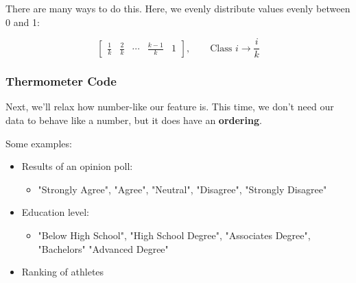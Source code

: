                 \miniex There are many ways to do this. Here, we evenly distribute values evenly between 0 and 1:
    
                    \begin{equation}
                        \begin{bmatrix}
                            \frac{1}{k} & \frac{2}{k} & \cdots & \frac{k-1}{k} & 1
                        \end{bmatrix},
                        \qquad 
                        \text{Class } i \longrightarrow \frac{i}{k}
                    \end{equation}

            \subsecdiv
            \subsubsection{Thermometer Code}

                Next, we'll relax how number-like our feature is. This time, we don't need our data to behave like a number, but it does have an \textbf{ordering}.

                Some examples:

                \begin{itemize}
                    \item Results of an opinion poll:
                        \begin{itemize}
                            \item "Strongly Agree", "Agree", "Neutral", "Disagree", "Strongly Disagree"
                        \end{itemize}
                    
                    \item Education level: 
                        \begin{itemize}
                            \item "Below High School", "High School Degree", "Associates Degree", "Bachelors" "Advanced Degree"
                        \end{itemize}
                    
                    \item Ranking of athletes
                \end{itemize}


